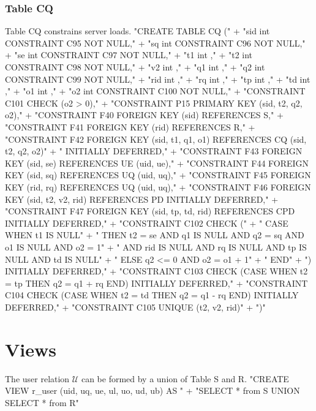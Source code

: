 \subsection{Table CQ}
Table CQ constrains server loads.
\nwenddocs{}\endmoddef{}
"CREATE TABLE CQ ("
  + "sid int  CONSTRAINT C95 NOT NULL,"
  + "sq  int  CONSTRAINT C96 NOT NULL,"
  + "se  int  CONSTRAINT C97 NOT NULL,"
  + "t1  int  ,"
  + "t2  int  CONSTRAINT C98 NOT NULL,"
  + "v2  int  ,"
  + "q1  int  ,"
  + "q2  int  CONSTRAINT C99 NOT NULL,"
  + "rid int  ,"
  + "rq  int  ,"
  + "tp  int  ,"
  + "td  int  ,"
  + "o1  int  ,"
  + "o2  int  CONSTRAINT C100 NOT NULL,"
  + "CONSTRAINT C101 CHECK (o2 > 0),"
  + "CONSTRAINT P15 PRIMARY KEY (sid, t2, q2, o2),"
  + "CONSTRAINT F40 FOREIGN KEY (sid) REFERENCES S,"
  + "CONSTRAINT F41 FOREIGN KEY (rid) REFERENCES R,"
  + "CONSTRAINT F42 FOREIGN KEY (sid, t1, q1, o1) REFERENCES CQ (sid, t2, q2, o2)"
  + "  INITIALLY DEFERRED,"
  + "CONSTRAINT F43 FOREIGN KEY (sid, se) REFERENCES UE (uid, ue),"
  + "CONSTRAINT F44 FOREIGN KEY (sid, sq) REFERENCES UQ (uid, uq),"
  + "CONSTRAINT F45 FOREIGN KEY (rid, rq) REFERENCES UQ (uid, uq),"
  + "CONSTRAINT F46 FOREIGN KEY (sid, t2, v2, rid) REFERENCES PD INITIALLY DEFERRED,"
  + "CONSTRAINT F47 FOREIGN KEY (sid, tp, td, rid) REFERENCES CPD INITIALLY DEFERRED,"
  + "CONSTRAINT C102 CHECK ("
  + "  CASE WHEN t1 IS NULL"
  + "    THEN t2 = se AND q1 IS NULL AND q2 = sq AND o1 IS NULL AND o2 = 1"
  + "        AND rid IS NULL AND rq IS NULL AND tp IS NULL AND td IS NULL"
  + "    ELSE q2 <= 0 AND o2 = o1 + 1"
  + "  END"
  + ") INITIALLY DEFERRED,"
  + "CONSTRAINT C103 CHECK (CASE WHEN t2 = tp THEN q2 = q1 + rq END) INITIALLY DEFERRED,"
  + "CONSTRAINT C104 CHECK (CASE WHEN t2 = td THEN q2 = q1 - rq END) INITIALLY DEFERRED,"
  + "CONSTRAINT C105 UNIQUE (t2, v2, rid)"
  + ")"
\nwendcode{}\nwdocspar

\chapter{Views}
\label{views}

The user relation $\mathcal{U}$ can be formed by a union of Table S and R.
\nwenddocs{}\endmoddef{}
"CREATE VIEW r_user (uid, uq, ue, ul, uo, ud, ub) AS "
  + "SELECT * from S UNION SELECT * from R"
\nwendcode{}\nwdocspar

